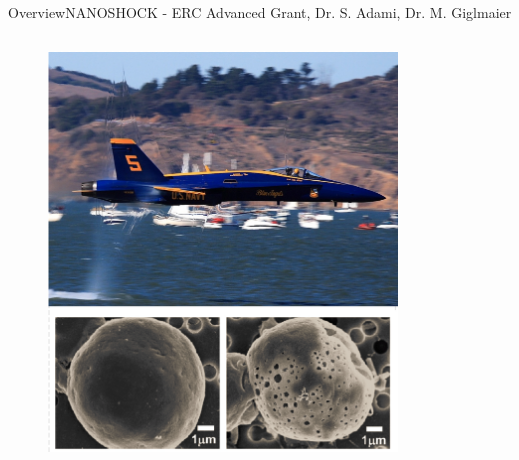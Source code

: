 \documentclass[AERbeamer%
              ,optEnglish%
              ,optBiber%
              ,optBibstyleAlphabetic%
              ,optBeamerClassicFormat%
              ]{AERlatex}%
\begin{document}
\begin{frame}[c]{Overview}{NANOSHOCK - ERC Advanced Grant, Dr. S. Adami, Dr. M. Giglmaier}
\begin{columns}[T]
\begin{column}{0.48\textwidth}
\begin{figure}
                \includegraphics[width=0.825\textwidth]{Nanoshock2.png}
            \end{figure}
        \end{column}
    \end{columns}
\end{frame}
\end{document}
